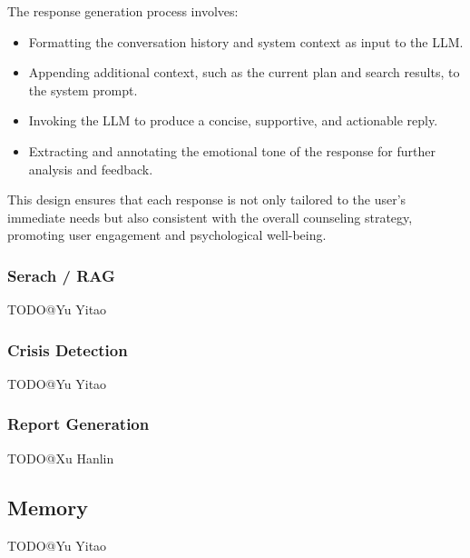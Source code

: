 The response generation process involves:
\begin{itemize}
    \item Formatting the conversation history and system context as input to the LLM.
    \item Appending additional context, such as the current plan and search results, to the system prompt.
    \item Invoking the LLM to produce a concise, supportive, and actionable reply.
    \item Extracting and annotating the emotional tone of the response for further analysis and feedback.
\end{itemize}

This design ensures that each response is not only tailored to the user's immediate needs but also consistent with the overall counseling strategy, promoting user engagement and psychological well-being.

\subsubsection{Serach / RAG}

TODO@Yu Yitao

\subsubsection{Crisis Detection}

TODO@Yu Yitao

\subsubsection{Report Generation}

TODO@Xu Hanlin

\subsection{Memory}

TODO@Yu Yitao